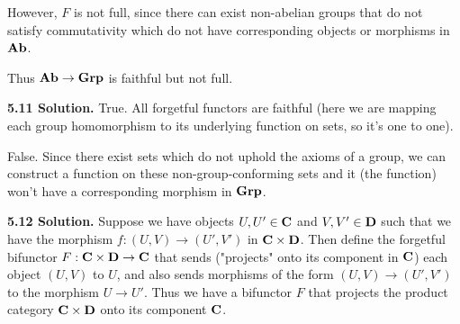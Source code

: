 However, $F$ is not full, since there can exist non-abelian groups that do not satisfy commutativity which do not have corresponding objects or morphisms in $\bf{Ab}$.

Thus $\bf{Ab} \to \bf{Grp}$ is faithful but not full.

\textbf{5.11 Solution.} True. All forgetful functors are faithful (here we are mapping each group homomorphism to its underlying function on sets, so it's one to one).

False. Since there exist sets which do not uphold the axioms of a group, we can construct a function on these non-group-conforming sets and it (the function) won't have a corresponding morphism in $\bf{Grp}$.

\textbf{5.12 Solution.} Suppose we have objects $U, U' \in \bf{C}$ and $V, V' \in \bf{D}$ such that we have the morphism $f: (U,V) \to (U',V')$ in $\bf{C} \times \bf{D}$. Then define the forgetful bifunctor $F: \bf{C} \times \bf{D} \to \bf{C}$ that sends ("projects" onto its component in $\bf{C}$) each object $(U,V)$ to $U$, and also sends morphisms of the form $(U,V) \to (U',V')$ to the morphism $U \to U'$. Thus we have a bifunctor $F$ that projects the product category $\bf{C} \times \bf{D}$ onto its component $\bf{C}$.